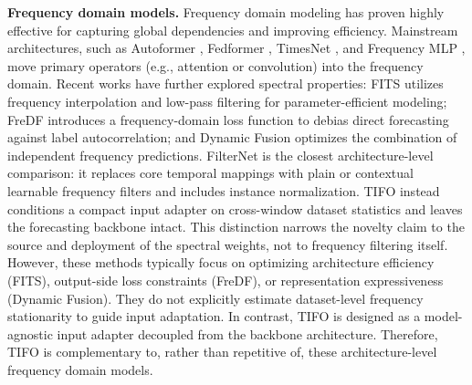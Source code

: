 \documentclass[sigconf,anonymous,review]{acmart}
\newcommand{\methodn}{\textsc{TIFO}}
\newcommand{\method}{\textsc{\methodn}\xspace}
\begin{document}
\noindent\textbf{Frequency domain models.}
Frequency domain modeling has proven highly effective for capturing global dependencies and improving efficiency.
Mainstream architectures, such as Autoformer \citep{Autoformer}, Fedformer \citep{ICMLFedformer}, TimesNet \citep{Timesnet}, and Frequency MLP \citep{yi2023frequencyMLP}, move primary operators (e.g., attention or convolution) into the frequency domain.
Recent works have further explored spectral properties: FITS \citep{xu2024fits} utilizes frequency interpolation and low-pass filtering for parameter-efficient modeling; FreDF \citep{2025fredf} introduces a frequency-domain loss function to debias direct forecasting against label autocorrelation; and Dynamic Fusion \citep{zhang2024not_all_fre} optimizes the combination of independent frequency predictions.
FilterNet \citep{yi2024filternet} is the closest architecture-level comparison:
it replaces core temporal mappings with plain or contextual learnable frequency
filters and includes instance normalization. TIFO instead conditions a compact
input adapter on cross-window dataset statistics and leaves the forecasting
backbone intact. This distinction narrows the novelty claim to the source and
deployment of the spectral weights, not to frequency filtering itself.
However, these methods typically focus on optimizing architecture efficiency (FITS), output-side loss constraints (FreDF), or representation expressiveness (Dynamic Fusion). 
They do not explicitly estimate dataset-level frequency stationarity to guide input adaptation.
In contrast, \method is designed as a model-agnostic input adapter decoupled from the backbone architecture.
Therefore, \method is complementary to, rather than repetitive of, these architecture-level frequency domain models.


\end{document}
